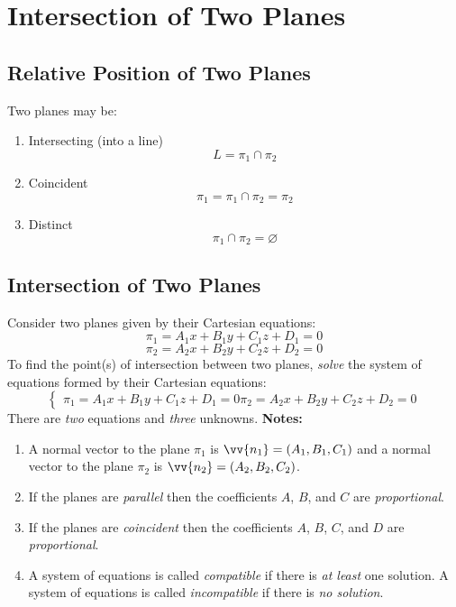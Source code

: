 \section{Intersection of Two Planes}
\subsection{Relative Position of Two Planes}
	Two planes may be:
	\begin{enumerate}
		\item Intersecting (into a line) \[L = \pi_1 \cap \pi_2\]
		\item Coincident \[\pi_1 = \pi_1 \cap \pi_2 = \pi_2\]
		\item Distinct \[\pi_1 \cap \pi_2 = \varnothing\]
	\end{enumerate}
\subsection{Intersection of Two Planes}
	Consider two planes given by their Cartesian equations:
	\[\pi_1 = A_1x + B_1y + C_1z + D_1 = 0\]
	\[\pi_2 = A_2x + B_2y + C_2z + D_2 = 0\]
	To find the point(s) of intersection between two planes, \emph{solve} the system of equations formed by their Cartesian equations:
	\begin{equation}\label{eq:9.3:system}
		\begin{cases}
			\pi_1 = A_1x + B_1y + C_1z + D_1 = 0
			\pi_2 = A_2x + B_2y + C_2z + D_2 = 0
		\end{cases}
	\end{equation}
	There are \emph{two} equations and \emph{three} unknowns.
	\textbf{Notes:}
	\begin{enumerate}
		\item A normal vector to the plane $\pi_1$ is $\vv{n_1} = (A_1, B_1, C_1)$ and a normal vector to the plane $\pi_2$ is $\vv{n_2} = (A_2, B_2, C_2)$.
		\item If the planes are \emph{parallel} then the coefficients $A$, $B$, and $C$ are \emph{proportional}.
		\item If the planes are \emph{coincident} then the coefficients $A$, $B$, $C$, and $D$ are \emph{proportional}.
		\item A system of equations is called \emph{compatible} if there is \emph{at least} one solution. A system of equations is called \emph{incompatible} if there is \emph{no solution}.
	\end{enumerate}
